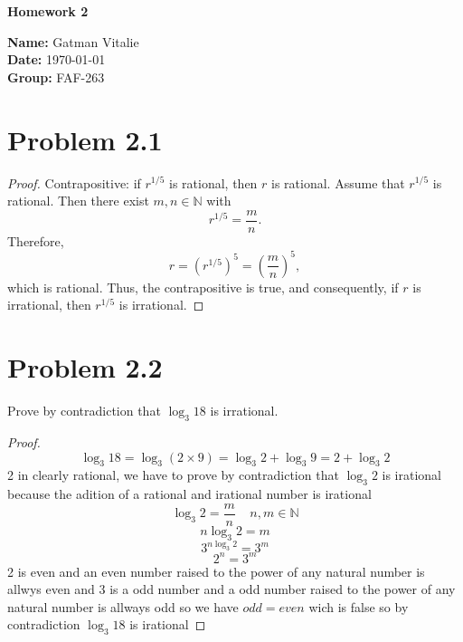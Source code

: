 \documentclass[12pt]{article}
\begin{document}
\begin{titlepage}
    \thispagestyle{fancy} %
    \centering
    
    \vspace*{4cm}

    {\Huge \bfseries Homework 2}

    \vspace{4cm}

    {\Large \textbf{Name:} Gatman Vitalie} \\[0.5em]
    {\Large \textbf{Date:} \today} \\[0.5em]
    {\Large \textbf{Group:} FAF-263}

    \vfill
\end{titlepage}

\newpage

\section*{Problem 2.1}
\begin{proof}
Contrapositive: if $r^{1/5}$ is rational, then $r$ is rational.
Assume that $r^{1/5}$ is rational. Then there exist $m,n \in \mathbb{N}$ with
\[
r^{1/5} = \frac{m}{n}.
\]
Therefore,
\[
r = \left(r^{1/5}\right)^5 = \left(\frac{m}{n}\right)^5,
\]
which is rational. Thus, the contrapositive is true, and consequently, if $r$ is irrational, then $r^{1/5}$ is irrational.
\end{proof}


\section*{Problem 2.2}
{
    Prove by contradiction that $\log_3{18}$ is irrational.

    \begin{proof}
        \[
            \log_3{18}=\log_3{(2\times9)}=\log_3{2}+\log_3{9}=2+\log_3{2}
        \]
        2 in clearly rational, we have to prove by contradiction that $\log_3{2}$ is irational because the adition of a rational and irational number is irational
        \[
            \log_3{2}=\frac{m}{n}\;\;\;\;n,m\in \mathbb{N}
        \]
        \[
            n\log_3{2}=m
        \]
        \[
            3^{n\log_3{2}}=3^{m}
        \]
        \[
            2^n=3^{m}
        \]
        2 is even and an even number raised to the power of any natural number is allwys even and 3 is a odd number and a odd number raised to the power of any natural number is allways odd so we have $odd=even$ wich is false so by contradiction $\log_3{18}$ is irational
    \end{proof}
}
\end{document}
